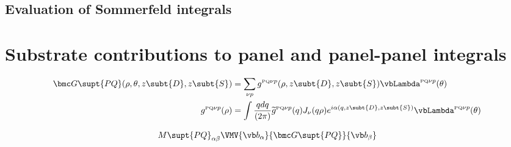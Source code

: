 \documentclass[letterpaper]{article}
\renewcommand{\wt}{\widetilde}
\begin{document}
\newpage
\subsection{Evaluation of Sommerfeld integrals}
\label{SommerfeldSection}

\newpage
\section{Substrate contributions to panel and panel-panel integrals}
\label{BEMCorrectionSection}

\begin{align*}
 \bmc G\supt{PQ}(\rho, \theta, z\subt{D}, z\subt{S})
  &= \sum_{\nu p} 
      g^{\text{\tiny PQ}\nu p}(\rho, z\subt{D}, z\subt{S})
      \vbLambda^{\text{\tiny PQ}\nu p}(\theta)
\label{GPQExpression}
\\
g^{\text{\tiny PQ}\nu p}(\rho)
&=\int \frac{qdq}{(2\pi)}
       \wt{g}^{\text{\tiny PQ}\nu p}(q)
        J_\nu(q\rho) e^{i\alpha(q,z\subt{D},z\subt{S})} 
        \vbLambda^{\text{\tiny PQ}\nu p}(\theta)
\end{align*}

\begin{align*}
M\supt{PQ}_{\alpha\beta}
 \VMV{\vb b_\alpha}{\bmc G\supt{PQ}}{\vb b_\beta}
\end{align*}

\end{document}
